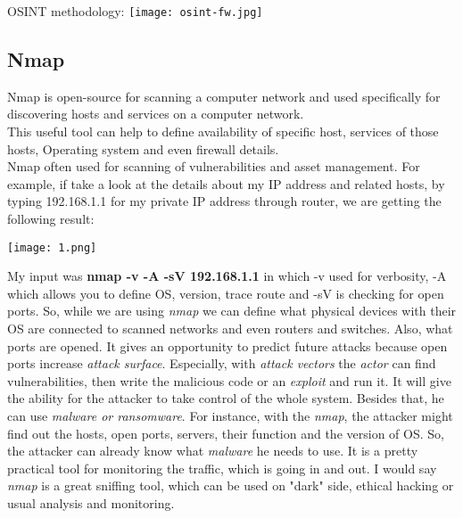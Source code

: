\documentclass[12pt, letterpaper, twoside]{article}
\begin{document}
\newpage
\large{OSINT methodology}\cite{SentinelOne}:\newline
\texttt{[image:  osint-fw.jpg]} 

\newpage

\subsection{Nmap}
Nmap is open-source for scanning a computer network and used specifically for discovering hosts and services on a computer network.\cite{SentinelOne}\\
This useful tool can help to define availability of specific host, services of those hosts, Operating system and even firewall details.\cite{VARONIS}\\
Nmap often used for scanning of vulnerabilities\cite{DATAINSIDER} and asset management.
For example, if take a look at the details about my IP address and related hosts, by typing 192.168.1.1 for my private IP address through router, we are getting the following result:
\vspace{5mm}

\texttt{[image: 1.png]}\break

My input was \textbf{nmap -v -A -sV 192.168.1.1} in which -v used for verbosity, -A which allows you to define OS, version, trace route and -sV is checking for open ports. 
So, while we are using \textit{nmap} we can define what physical devices with their OS are connected to scanned networks and even routers and switches. Also, what ports are opened. It gives an opportunity to predict future attacks because open ports increase \textit{attack surface}. Especially, with \textit{attack vectors} the \textit{actor} can find vulnerabilities, then write the malicious code or an \textit{exploit} and run it. It will give the ability for the attacker to take control of the whole system.\cite{SECUREWORKS} Besides that, he can use \textit{malware or ransomware}. For instance, with the \textit{nmap}, the attacker might find out the hosts, open ports, servers, their function and the version of OS. So, the attacker can already know what \textit{malware} he needs to use. It is a pretty practical tool for monitoring the traffic, which is going in and out. I would say \textit{nmap} is a great sniffing tool, which can be used on "dark" side, ethical hacking or usual analysis and monitoring.  

\newpage
\end{document}

